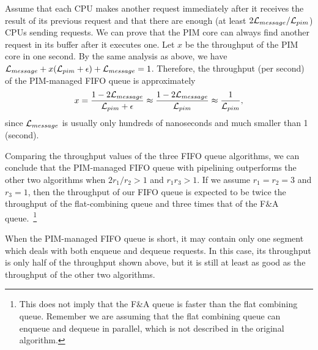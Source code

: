 Assume that each CPU makes another request immediately after it receives the result of its previous request 
and that there are enough (at least $2\mathcal{L}_{message} / \mathcal{L}_{pim}$) CPUs sending requests.
We can prove that the PIM core can always find another request in its buffer after it executes one. 
Let $x$ be the throughput of the PIM core in one second.
By the same analysis as above, we have $\mathcal{L}_{message} + x(\mathcal{L}_{pim} + \epsilon) + \mathcal{L}_{message} = 1$. 
Therefore, the throughput (per second) of the PIM-managed FIFO queue is approximately 
$$x = {1 - 2\mathcal{L}_{message} \over \mathcal{L}_{pim} + \epsilon} \approx {1 - 2\mathcal{L}_{message}\over \mathcal{L}_{pim}} 
\approx {1 \over \mathcal{L}_{pim}},$$
since $\mathcal{L}_{message}$ is usually only hundreds of nanoseconds and much smaller than 1 (second). 

Comparing the throughput values of the three FIFO queue algorithms, 
we can conclude that the PIM-managed FIFO queue with pipelining outperforms the other two algorithms 
when $2r_1 / r_2 > 1$ and $r_1 r_3 > 1$. 
If we assume $r_1 = r_2 = 3$ and $r_3 = 1$, then the throughput of our FIFO queue is expected to be 
twice the throughput of the flat-combining queue and three times that
of the F\&A queue.~\footnote{This does not imply that the F\&A queue is faster than the flat combining queue. Remember we 
are assuming that the flat combining queue can enqueue and dequeue in parallel, which is not described 
in the original algorithm.}

When the PIM-managed FIFO queue is short, it may contain only one segment 
which deals with both enqueue and dequeue requests. 
In this case, its throughput is only half of the throughput shown above, 
but it is still at least as good as the throughput of the other two algorithms. 

